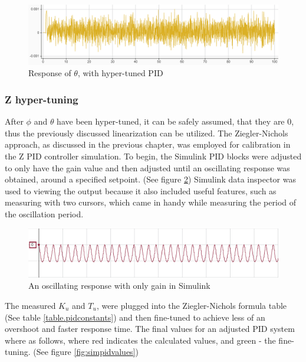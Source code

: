 \begin{figure}[H]
    \begin{center}
    \includegraphics[width = \textwidth]{pictures/control/thetaPID.PNG}
    \end{center}
    \caption{Response of $\theta$, with hyper-tuned PID}
    \label{fig:thetaPID}
\end{figure}

\subsubsection{Z hyper-tuning}
After $\phi$ and $\theta$ have been hyper-tuned, it can be safely assumed, that they are 0, thus the previously discussed linearization can be utilized. 
The Ziegler-Nichols approach, as discussed in the previous chapter, was employed for calibration in the Z PID controller simulation. To begin, the Simulink PID blocks were adjusted to only have the gain value and then adjusted until an oscillating response was obtained, around a specified setpoint. (See figure \ref{fig:posc}) Simulink data inspector was used to viewing the output because it also included useful features, such as measuring with two cursors, which came in handy while measuring the period of the oscillation period.

\begin{figure}[H]
    \begin{center}
    \includegraphics[width = \textwidth]{pictures/control/posc}
    \end{center}
    \caption{An oscillating response with only gain in Simulink}
    \label{fig:posc}
\end{figure}

The measured $K_u$ and $T_u$, were plugged into the Ziegler-Nichols formula table (See table \ref{table.pidconstants}) and then fine-tuned to achieve less of an overshoot and faster response time.
The final values for an adjusted PID system where as follows, where red indicates the calculated values, and green - the fine-tuning. (See figure \ref{fig:simpidvalues})

